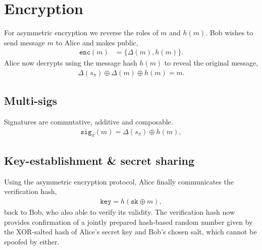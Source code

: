 \documentclass[twocolumn, aps, amsmath, amssymb, nofootinbib, superscriptaddress, longbibliography, doublefloatfix, table-of-contents, eqsecnum, rmp]{revtex4-2}
\begin{document}


\section{Encryption}

For asymmetric encryption we reverse the roles of $m$ and $h(m)$. Bob wishes to send message $m$ to Alice and makes public,
\begin{align}
	\mathtt{enc}(m) &= \{\Delta(m), h(m)\}. 
\end{align}
Alice now decrypts using the message hash $h(m)$ to reveal the original message,
\begin{align}
	\Delta(s_\pi) \oplus \Delta(m) \oplus h(m) = m.
\end{align}

\subsection{Multi-sigs}

Signatures are commutative, additive and composable.
\begin{align}
	\mathtt{sig}_\pi(m) = \Delta(s_\pi) \oplus h(m),
\end{align}

\subsection{Key-establishment \& secret sharing}

Using the asymmetric encryption protocol, Alice finally communicates the verification hash,
\begin{align}
	\mathtt{key} = h(\mathtt{sk}\oplus m),
\end{align}
back to Bob, who also able to verify its validity. The verification hash now provides confirmation of a jointly prepared hash-based random number given by  the XOR-salted hash of Alice's secret key and Bob's chosen salt, which cannot be spoofed by either.
\end{document}
